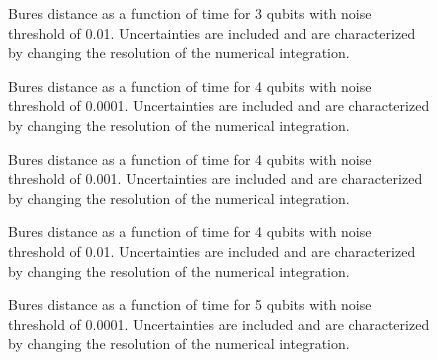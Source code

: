 \begin{figure}
\begin{center}
\end{center}
\caption{Bures distance as a function of time for 3 qubits with noise
threshold of 0.01.  Uncertainties are included and are characterized 
by changing the resolution of the numerical integration.}
\end{figure}

\begin{figure}
\begin{center}
\end{center}
\caption{Bures distance as a function of time for 4 qubits with noise
threshold of 0.0001.  Uncertainties are included and are characterized 
by changing the resolution of the numerical integration.}
\end{figure}

\begin{figure}
\begin{center}
\end{center}
\caption{Bures distance as a function of time for 4 qubits with noise
threshold of 0.001.  Uncertainties are included and are characterized 
by changing the resolution of the numerical integration.}
\end{figure}

\begin{figure}
\begin{center}
\end{center}
\caption{Bures distance as a function of time for 4 qubits with noise
threshold of 0.01.  Uncertainties are included and are characterized 
by changing the resolution of the numerical integration.}
\end{figure}

\begin{figure}
\begin{center}
\end{center}
\caption{Bures distance as a function of time for 5 qubits with noise
threshold of 0.0001.  Uncertainties are included and are characterized 
by changing the resolution of the numerical integration.}
\end{figure}

